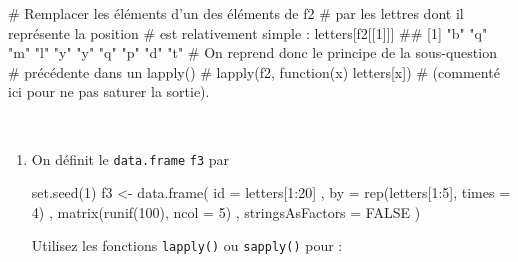 \documentclass[12pt,]{article}
\newenvironment{Shaded}{}{}
\newcommand{\KeywordTok}[1]{\textcolor[rgb]{0.00,0.00,1.00}{{#1}}}
\newcommand{\DataTypeTok}[1]{{#1}}
\newcommand{\DecValTok}[1]{{#1}}
\newcommand{\StringTok}[1]{\textcolor[rgb]{0.00,0.50,0.50}{{#1}}}
\newcommand{\CommentTok}[1]{\textcolor[rgb]{0.00,0.50,0.00}{{#1}}}
\newcommand{\OtherTok}[1]{\textcolor[rgb]{1.00,0.25,0.00}{{#1}}}
\newcommand{\NormalTok}[1]{{#1}}
\begin{document}
\begin{itemize}
\begin{Shaded}
\begin{Highlighting}[]
\CommentTok{# Remplacer les éléments d'un des éléments de f2}
\CommentTok{# par les lettres dont il représente la position}
\CommentTok{# est relativement simple : }
\NormalTok{letters[f2[[}\DecValTok{1}\NormalTok{]]]}
\NormalTok{##  [1] "b" "q" "m" "l" "y" "y" "q" "p" "d" "t"}
\CommentTok{# On reprend donc le principe de la sous-question}
\CommentTok{# précédente dans un lapply()}
\CommentTok{# lapply(f2, function(x) letters[x])}
\CommentTok{# (commenté ici pour ne pas saturer la sortie).}
\end{Highlighting}
\end{Shaded}

  ~
\end{itemize}

\begin{enumerate}
\def\labelenumi{\alph{enumi}.}
\setcounter{enumi}{2}
\item
  On définit le \texttt{data.frame} \texttt{f3} par

\begin{Shaded}
\begin{Highlighting}[]
\KeywordTok{set.seed}\NormalTok{(}\DecValTok{1}\NormalTok{)}
\NormalTok{f3 <-}\StringTok{ }\KeywordTok{data.frame}\NormalTok{(}
  \DataTypeTok{id =} \NormalTok{letters[}\DecValTok{1}\NormalTok{:}\DecValTok{20}\NormalTok{]}
  \NormalTok{, }\DataTypeTok{by =} \KeywordTok{rep}\NormalTok{(letters[}\DecValTok{1}\NormalTok{:}\DecValTok{5}\NormalTok{], }\DataTypeTok{times =} \DecValTok{4}\NormalTok{)}
  \NormalTok{, }\KeywordTok{matrix}\NormalTok{(}\KeywordTok{runif}\NormalTok{(}\DecValTok{100}\NormalTok{), }\DataTypeTok{ncol =} \DecValTok{5}\NormalTok{)}
  \NormalTok{, }\DataTypeTok{stringsAsFactors =} \OtherTok{FALSE}
\NormalTok{)}
\end{Highlighting}
\end{Shaded}

  Utilisez les fonctions \texttt{lapply()} ou \texttt{sapply()} pour :
\end{enumerate}
\end{document}
